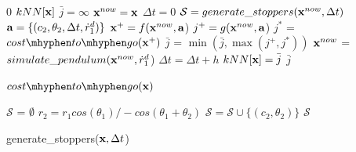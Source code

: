 \begin{algorithm}
   {
    \Return $0$\; 
    \label{alg:line:falling_terminal}
  }
      { \label{alg:line:falling_knn_query} 
        \Return $kNN[\mathbf{x}]$\;
      }
      $\bar{j} = \infty$\;
       { \label{alg:line:falling_rdot}
        $\mathbf{x}^{now}=\mathbf{x}$\;
        $\Delta t=0$\;
         { \label{alg:line:falling_theta}
          $\mathcal{S} = generate\_stoppers(\mathbf{x}^{now}, \Delta t)$\; \label{alg:line:falling_collect}
           {
            $\mathbf{a}=\{(c_2, \theta_2, \Delta t, \dot{r}_1^d)\}$\;
            $\mathbf{x}^{+}=f(\mathbf{x}^{now}, \mathbf{a}$)\;
            $ j^{+}=g(\mathbf{x}^{now}, \mathbf{a}$)\;
            $j^{*}$ = $cost \mhyphen to \mhyphen go(\vc{x}^{+})$\;
            $\bar{j}$ = $\min(\bar{j}, \max{(j^{+}, j^{*})})$\;
          }
          $\mathbf{x}^{now}$ = $simulate\_pendulum(\mathbf{x}^{now}, \dot{r}_1^d$)\; \label{alg:line:falling_sim}
          $\Delta t = \Delta t + h$\;
        }
      }
      $kNN[\mathbf{x}]=\bar{j}$\; \label{alg:line:falling_knn_save} 
      \Return $\bar{j}$\;
      \caption{$cost \mhyphen to \mhyphen go(\vc{x})$}
      \label{alg:falling_recursive}
\end{algorithm}


\begin{algorithm}
  $\mathcal{S}$ = $\emptyset$\;
   {
    \For{$\theta_2 \in [-\pi, \pi]$} {
      $r_2 = r_1 cos(\theta_1) / -cos(\theta_1 + \theta_2)$\;
      $\mathcal{S} = \mathcal{S} \cup \{(c_2, \theta_2)\}$\;
    }
  }
  \Return $\mathcal{S}$\;
  \caption{generate\_stoppers($\mathbf{x}, \Delta t$)}
  \label{alg:falling_stopper}
\end{algorithm}

